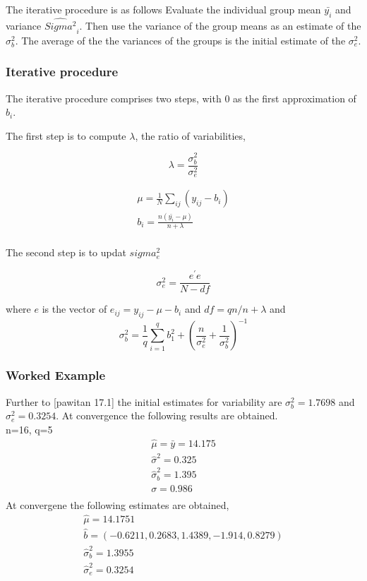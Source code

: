 \documentclass[12pt, a4paper]{report}
\theoremstyle{plain}
\theoremstyle{definition}
\theoremstyle{remark}
\begin{document}
	The iterative procedure is as follows Evaluate the individual group mean $\bar{y_{i}}$ and variance $\hat{Sigma^2}_{i}$. Then use the variance of the group means as an estimate of the $\sigma^2_{b}$. The average of the the variances of the groups is the initial estimate of the $\sigma^2_{e}$.
	\subsubsection{Iterative procedure}
	
	The iterative procedure comprises two steps, with $0$ as the first approximation of $b_{i}$.
	
	The first step is to compute $\lambda$, the ratio of variabilities,
	
	\begin{equation*}
	\lambda = \frac{\sigma^2_{b}}{\sigma^2_{e}}
	\end{equation*}
	
	\begin{eqnarray*}
		\mu = \frac{1}{N} \sum_{ij} (y_{ij} - b_{i}) \\
		b_{i} = \frac{n(\bar{y_{i}}-\mu)}{n+ \lambda} \\
	\end{eqnarray*}
	
	
	The second step is to updat $sigma^2_{e}$
	
	\begin{equation}
	\sigma^2_{e} = \frac{e^{\prime}e}{N-df}
	\end{equation}
	
	where $e$ is the vector of $e_{ij} = y_{ij}-\mu-b_{i}$ and $df =
	qn / n+\lambda$ and
	\begin{equation}
	\sigma^{2}_{b} = \frac{1}{q} \sum_{i=1}^{q} b_{1}^2 +
	(\frac{n}{\sigma^2_{e}}+\frac{1}{\sigma^2_{b}})^{-1}
	\end{equation}
	
	\subsubsection{Worked Example}
	
	Further to [pawitan 17.1] the initial estimates for variability
	are $\sigma^{2}_{b} = 1.7698$ and $\sigma^{2}_{e} = 0.3254$. At
	convergence the following results are obtained.
	\\
	n=16, q=5
	\begin{eqnarray*}
		\hat{\mu} = \bar{y} = 14.175 \\
		\hat{\sigma}^2 = 0.325\\
		\hat{\sigma}^2_{b} = 1.395\\
		\sigma  = 0.986 \\
	\end{eqnarray*}
	At convergene the following estimates are obtained,
	\begin{eqnarray*}
		\hat{\mu} = 14.1751 \\
		\hat{b}= (-0.6211, 0.2683,1.4389,-1.914,0.8279)\\
		\hat{\sigma}^2_{b} = 1.3955\\
		\hat{\sigma}^2_{e} = 0.3254\\
	\end{eqnarray*}
	
\end{document}
